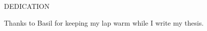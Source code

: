 \newpage
{}

\begin{center}
DEDICATION
\end{center}

\begin{center}
Thanks to Basil for keeping my lap warm while I write my thesis.
\end{center}

